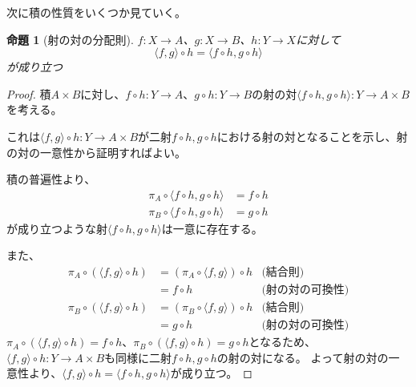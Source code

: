 \documentclass[dvipdfmx]{jsarticle}
\newcommand{\arrow}{\rightarrow}
\newcommand{\tuple}[1]{\langle #1\rangle}
\newcommand{\mor}[3]{#1:#2\arrow #3}
\newtheorem{proof}{証明}[section]
\newtheorem{prop}{命題}[section]
\numberwithin{proof}{subsection}
\numberwithin{prop}{subsection}
\numberwithin{define}{subsection}
\begin{document}
	次に積の性質をいくつか見ていく。
	\begin{prop}[射の対の分配則]
		$\mor{f}{X}{A}$、$\mor{g}{X}{B}$、$\mor{h}{Y}{X}$に対して\[\tuple{f,g}\circ h=\tuple{f\circ h,g\circ h}\]が成り立つ
	\end{prop}
	\begin{proof}
		積$A\times B$に対し、$\mor{f\circ h}{Y}{A}$、$\mor{g\circ h}{Y}{B}$の射の対$\mor{\tuple{f\circ h,g\circ h}}{Y}{A\times B}$を考える。

		これは$\mor{\tuple{f,g}\circ h}{Y}{A\times B}$が二射$f\circ h,g\circ h$における射の対となることを示し、射の対の一意性から証明すればよい。

		積の普遍性より、
		\begin{align*}
			\pi_A\circ\tuple{f\circ h,g\circ h}&=f\circ h\\
			\pi_B\circ\tuple{f\circ h,g\circ h}&=g\circ h
		\end{align*}
		が成り立つような射$\tuple{f\circ h,g\circ h}$は一意に存在する。

		また、
		\begin{align*}
			\pi_A\circ(\tuple{f,g}\circ h)&=(\pi_A\circ\tuple{f,g})\circ h&\text{(結合則)}\\
			&=f\circ h&\text{(射の対の可換性)}\\
			\pi_B\circ(\tuple{f,g}\circ h)&=(\pi_B\circ\tuple{f,g})\circ h&\text{(結合則)}\\
			&=g\circ h&\text{(射の対の可換性)}
		\end{align*}
		$\pi_A\circ(\tuple{f,g}\circ h)=f\circ h$、$\pi_B\circ(\tuple{f,g}\circ h)=g\circ h$となるため、$\mor{\tuple{f,g}\circ h}{Y}{A\times B}$も同様に二射$f\circ h,g\circ h$の射の対になる。
		よって射の対の一意性より、$\tuple{f,g}\circ h=\tuple{f\circ h,g\circ h}$が成り立つ。
	\end{proof}
\end{document}
